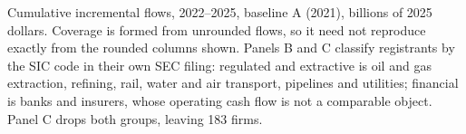 \documentclass[preprint,11pt]{elsarticle}
\begin{document}
\noindent\footnotesize Cumulative incremental flows, 2022--2025, baseline A (2021), billions of 2025 dollars. Coverage is
formed from unrounded flows, so it need not reproduce exactly from the rounded columns shown.
Panels B and C classify registrants by the SIC code in their own SEC filing: regulated and
extractive is oil and gas extraction, refining, rail, water and air transport, pipelines and
utilities; financial is banks and insurers, whose operating cash flow is not a comparable object.
Panel C drops both groups, leaving 183 firms.\normalsize
\end{document}
